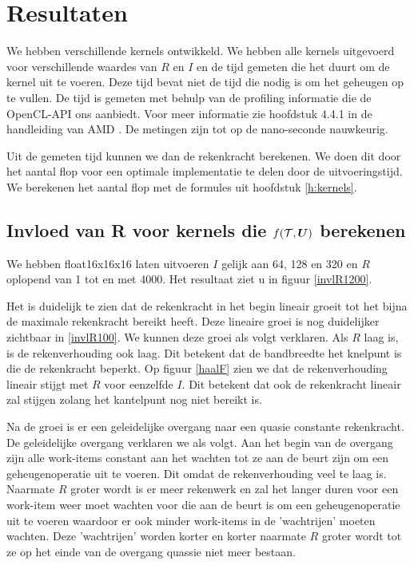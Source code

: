 \chapter{Resultaten}
We hebben verschillende kernels ontwikkeld. We hebben alle kernels uitgevoerd voor verschillende waardes van $R$ en $I$ en de tijd gemeten die het duurt om de kernel uit te voeren. Deze tijd bevat niet de tijd die nodig is om het geheugen op te vullen. De tijd is gemeten met behulp van de profiling informatie die de OpenCL-API ons aanbiedt. Voor meer informatie zie hoofdstuk 4.4.1 in de handleiding van AMD \cite{amd}. De metingen zijn tot op de nano-seconde nauwkeurig. \cite[p.~4-13]{amd}

Uit de gemeten tijd kunnen we dan de rekenkracht berekenen. We doen dit door het aantal flop voor een optimale implementatie te delen door de uitvoeringstijd. We berekenen het aantal flop met de formules uit hoofdstuk \ref{h:kernels}.

\section{Invloed van R voor kernels die $f(\mathcal{T}, \boldsymbol{U})$ berekenen}
\label{h:invlR}
We hebben float16x16x16 laten uitvoeren $I$ gelijk aan 64, 128 en 320 en $R$ oplopend van 1 tot en met 4000. Het resultaat ziet u in figuur \ref{invlR1200}.

Het is duidelijk te zien dat de rekenkracht in het begin lineair groeit tot het bijna de maximale rekenkracht bereikt heeft. Deze lineaire groei is nog duidelijker zichtbaar in \ref{invlR100}. We kunnen deze groei als volgt verklaren. Als $R$ laag is, is de rekenverhouding ook laag. Dit betekent dat de bandbreedte het knelpunt is die de rekenkracht beperkt. Op figuur \ref{haalF} zien we dat de rekenverhouding lineair stijgt met $R$ voor eenzelfde $I$. Dit betekent dat ook de rekenkracht lineair zal stijgen zolang het kantelpunt nog niet bereikt is.

Na de groei is er een geleidelijke overgang naar een quasie constante rekenkracht. De geleidelijke overgang verklaren we als volgt. Aan het begin van de overgang zijn alle work-items constant aan het wachten tot ze aan de beurt zijn om een geheugenoperatie uit te voeren. Dit omdat de rekenverhouding veel te laag is. Naarmate $R$ groter wordt is er meer rekenwerk en zal het langer duren voor een work-item weer moet wachten voor die aan de beurt is om een geheugenoperatie uit te voeren waardoor er ook minder work-items in de 'wachtrijen' moeten wachten. Deze 'wachtrijen' worden korter en korter naarmate $R$ groter wordt tot ze op het einde van de overgang quassie niet meer bestaan.


